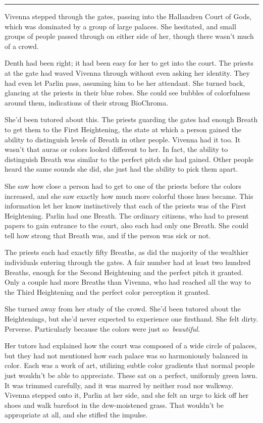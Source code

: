 \bigskip \hrule \bigskip

Vivenna stepped through the gates, passing into the Hallandren Court of Gods, which was dominated by a group of large palaces. She hesitated, and small groups of people passed through on either side of her, though there wasn’t much of a crowd.

Denth had been right; it had been easy for her to get into the court. The priests at the gate had waved Vivenna through without even asking her identity. They had even let Parlin pass, assuming him to be her attendant. She turned back, glancing at the priests in their blue robes. She could see bubbles of colorfulness around them, indications of their strong BioChroma.

She’d been tutored about this. The priests guarding the gates had enough Breath to get them to the First Heightening, the state at which a person gained the ability to distinguish levels of Breath in other people. Vivenna had it too. It wasn’t that auras or colors looked different to her. In fact, the ability to distinguish Breath was similar to the perfect pitch she had gained. Other people heard the same sounds she did, she just had the ability to pick them apart.

She saw how close a person had to get to one of the priests before the colors increased, and she saw exactly how much more colorful those hues became. This information let her know instinctively that each of the priests was of the First Heightening. Parlin had one Breath. The ordinary citizens, who had to present papers to gain entrance to the court, also each had only one Breath. She could tell how strong that Breath was, and if the person was sick or not.

The priests each had exactly fifty Breaths, as did the majority of the wealthier individuals entering through the gates. A fair number had at least two hundred Breaths, enough for the Second Heightening and the perfect pitch it granted. Only a couple had more Breaths than Vivenna, who had reached all the way to the Third Heightening and the perfect color perception it granted.

She turned away from her study of the crowd. She’d been tutored about the Heightenings, but she’d never expected to experience one firsthand. She felt dirty. Perverse. Particularly because the colors were just so~\textit{beautiful.}

Her tutors had explained how the court was composed of a wide circle of palaces, but they had not mentioned how each palace was so harmoniously balanced in color. Each was a work of art, utilizing subtle color gradients that normal people just wouldn’t be able to appreciate. These sat on a perfect, uniformly green lawn. It was trimmed carefully, and it was marred by neither road nor walkway. Vivenna stepped onto it, Parlin at her side, and she felt an urge to kick off her shoes and walk barefoot in the dew-moistened grass. That wouldn’t be appropriate at all, and she stifled the impulse.


